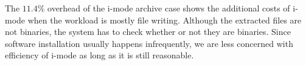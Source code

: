 The $11.4\%$ overhead of the i-mode archive case
shows the additional costs of i-mode when the workload is mostly file writing.
Although the extracted files are not binaries, the system
has to check whether or not they are binaries.
Since software installation usually happens infrequently,
we are less concerned with efficiency of
i-mode as long as it is still reasonable.
